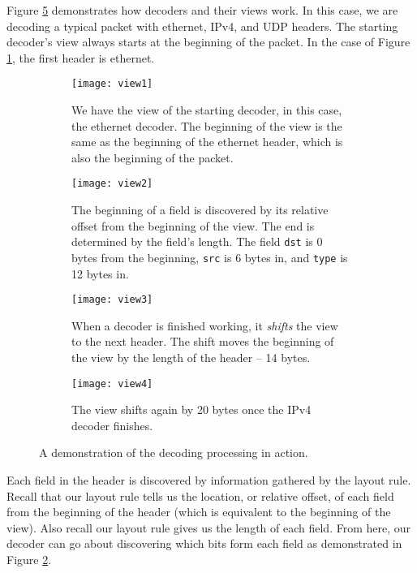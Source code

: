 Figure \ref{fg:decoding} demonstrates how decoders and their views work. In this case, we are decoding a typical packet with ethernet, IPv4, and UDP headers. The starting decoder's view always starts at the beginning of the packet. In the case of Figure \ref{fg:view1}, the first header is ethernet.

\begin{figure}[ht]
\begin{subfigure}[t]{.45\textwidth}
  \centering
  \texttt{[image: view1]}
  \caption{We have the view of the starting decoder, in this case, the ethernet decoder. The beginning of the view is the same as the beginning of the ethernet header, which is also the beginning of the packet.}
  \label{fg:view1}
\end{subfigure}%
\hfill
\begin{subfigure}[t]{.45\textwidth}
  \centering
  \texttt{[image: view2]}
  \caption{The beginning of a field is discovered by its relative offset from the beginning of the view. The end is determined by the field's length. The field \texttt{dst} is 0 bytes from the beginning, \texttt{src} is 6 bytes in, and \texttt{type} is 12 bytes in.}
  \label{fg:view2}
\end{subfigure}

\begin{subfigure}[t]{.45\textwidth}
  \centering
  \texttt{[image: view3]}
  \caption{When a decoder is finished working, it \textit{shifts} the view to the next header. The shift moves the beginning of the view by the length of the header -- 14 bytes.}
  \label{fg:view3}
\end{subfigure}%
\hfill
\begin{subfigure}[t]{.45\textwidth}
  \centering
  \texttt{[image: view4]}
  \caption{The view shifts again by 20 bytes once the IPv4 decoder finishes.}
  \label{fg:view4}
\end{subfigure}
\caption{A demonstration of the decoding processing in action.}
\label{fg:decoding}
\end{figure}

Each field in the header is discovered by information gathered by the layout rule. Recall that our layout rule tells us the location, or relative offset, of each field from the beginning of the header (which is equivalent to the beginning of the view). Also recall our layout rule gives us the length of each field. From here, our decoder can go about discovering which bits form each field as demonstrated in Figure \ref{fg:view2}.

